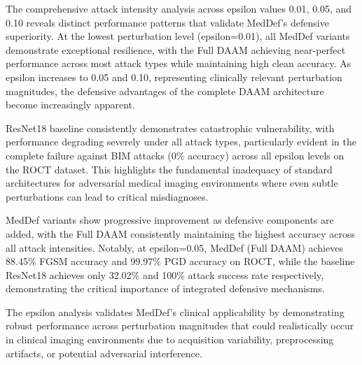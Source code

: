 \documentclass[preprint,12pt]{elsarticle}
\begin{document}
The comprehensive attack intensity analysis across epsilon values 0.01, 0.05, and 0.10 reveals distinct performance patterns that validate MedDef's defensive superiority. At the lowest perturbation level (epsilon=0.01), all MedDef variants demonstrate exceptional resilience, with the Full DAAM achieving near-perfect performance across most attack types while maintaining high clean accuracy. As epsilon increases to 0.05 and 0.10, representing clinically relevant perturbation magnitudes, the defensive advantages of the complete DAAM architecture become increasingly apparent.

ResNet18 baseline consistently demonstrates catastrophic vulnerability, with performance degrading severely under all attack types, particularly evident in the complete failure against BIM attacks (0\% accuracy) across all epsilon levels on the ROCT dataset. This highlights the fundamental inadequacy of standard architectures for adversarial medical imaging environments where even subtle perturbations can lead to critical misdiagnoses.

MedDef variants show progressive improvement as defensive components are added, with the Full DAAM consistently maintaining the highest accuracy across all attack intensities. Notably, at epsilon=0.05, MedDef (Full DAAM) achieves 88.45\% FGSM accuracy and 99.97\% PGD accuracy on ROCT, while the baseline ResNet18 achieves only 32.02\% and 100\% attack success rate respectively, demonstrating the critical importance of integrated defensive mechanisms.

The epsilon analysis validates MedDef's clinical applicability by demonstrating robust performance across perturbation magnitudes that could realistically occur in clinical imaging environments due to acquisition variability, preprocessing artifacts, or potential adversarial interference.
\end{document}
